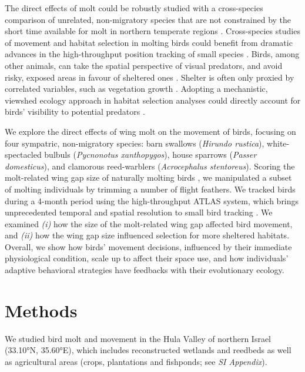 \begin{refsection}
The direct effects of molt could be robustly studied with a cross-species comparison of unrelated, non-migratory species that are not constrained by the short time available for molt in northern temperate regions \cite{ginn1983,jenni2020}.
Cross-species studies of movement and habitat selection in molting birds could benefit from dramatic advances in the high-throughput position tracking of small species \cite{toledo2020,nathan2022}.
Birds, among other animals, can take the spatial perspective of visual predators, and avoid risky, exposed areas in favour of sheltered ones \cite{hampton1994,emery2000,krams2001,davidson2016,krams2020}.
Shelter is often only proxied by correlated variables, such as vegetation growth \cite{pettorelli2011}. 
Adopting a mechanistic, viewshed ecology approach \cite{olsoy2015,aben2018,aben2021} in habitat selection analyses could directly account for birds' visibility to potential predators \cite{olsoy2015,aben2018,aben2021}.

We explore the direct effects of wing molt on the movement of birds, focusing on four sympatric, non-migratory species: barn swallows (\textit{Hirundo rustica}), white-spectacled bulbuls (\textit{Pycnonotus xanthopygos}), house sparrows (\textit{Passer domesticus}), and clamorous reed-warblers (\textit{Acrocephalus stentoreus}).
Scoring the molt-related wing gap size of naturally molting birds \citep{lind2001,kiat2016}, we manipulated a subset of molting individuals by trimming a number of flight feathers.
We tracked birds during a 4-month period using the high-throughput ATLAS system, which brings unprecedented temporal and spatial resolution to small bird tracking \citep{toledo2014,weiser2016,toledo2020,nathan2022,beardsworth}.
We examined \textit{(i)} how the size of the molt-related wing gap affected bird movement, and \textit{(ii)} how the wing gap size influenced selection for more sheltered habitats.
Overall, we show how birds' movement decisions, influenced by their immediate physiological condition, scale up to affect their space use, and how individuals' adaptive behavioral strategies have feedbacks with their evolutionary ecology.

\section*{Methods}

We studied bird molt and movement in the Hula Valley of northern Israel (33.10°N, 35.60°E), which includes reconstructed wetlands and reedbeds as well as agricultural areas (crops, plantations and fishponds; see \textit{SI Appendix}).


\end{refsection}

